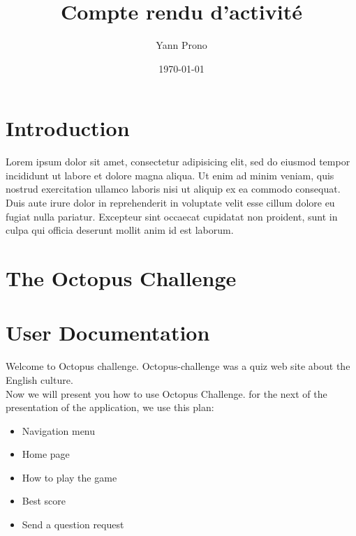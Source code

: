 \documentclass[a4paper,11pt, oneside]{book}
\title{Compte rendu d'activité}
\author{Yann Prono}
\date{\today}
\def\appName{The Octopus Challenge}
\begin{document}
	\begin{titlepage}
		
	\end{titlepage}


	\newpage

	\newpage\null\thispagestyle{empty}\newpage
	\tableofcontents

	\chapter{Introduction}
	Lorem ipsum dolor sit amet, consectetur adipisicing elit, sed do eiusmod tempor incididunt ut labore et dolore magna aliqua. Ut enim ad minim veniam, quis nostrud exercitation ullamco laboris nisi ut aliquip ex ea commodo consequat. Duis aute irure dolor in reprehenderit in voluptate velit esse cillum dolore eu fugiat nulla pariatur. Excepteur sint occaecat cupidatat non proident, sunt in culpa qui officia deserunt mollit anim id est laborum.
	\setcounter{page}{1}
	\clearpage

	\chapter{\appName}
	\clearpage

	\chapter{User Documentation}
	Welcome to Octopus challenge.
	Octopus-challenge was a quiz web site about the English culture.\\
	Now we will present you how to use Octopus Challenge.
	for the next of the presentation of the application, we use this plan:
	\begin{itemize}
		\item Navigation menu
		\item Home page
		\item How to play the game
		\item Best score
		\item Send a question request\\
	\end{itemize}
\end{document}
